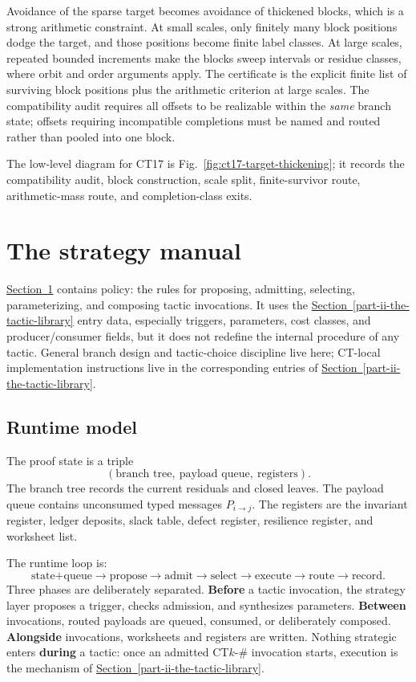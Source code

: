 \documentclass[
  11pt,
]{article}
\theoremstyle{definition}
\newcommand{\secref}[1]{\hyperref[#1]{Section~\ref*{#1}}}
\begin{document}
Avoidance of the sparse target becomes avoidance of thickened blocks,
which is a strong arithmetic constraint. At small scales, only finitely
many block positions dodge the target, and those positions become finite
label classes. At large scales, repeated bounded increments make the
blocks sweep intervals or residue classes, where orbit and order
arguments apply. The certificate is the explicit finite list of
surviving block positions plus the arithmetic criterion at large scales.
The compatibility audit requires all offsets to be realizable within the
\emph{same} branch state; offsets requiring incompatible completions must
be named and routed rather than pooled into one block.

The low-level diagram for CT17 is Fig.~\ref{fig:ct17-target-thickening};
it records the compatibility audit, block construction, scale split,
finite-survivor route, arithmetic-mass route, and completion-class exits.

\section{The strategy manual}\label{part-iii-the-strategy-manual}

\secref{part-iii-the-strategy-manual} contains policy: the rules for proposing, admitting,
selecting, parameterizing, and composing tactic invocations. It uses the
\secref{part-ii-the-tactic-library} entry data, especially triggers, parameters, cost classes, and
producer/consumer fields, but it does not redefine the internal
procedure of any tactic. General branch design and tactic-choice
discipline live here; CT-local implementation instructions live in the
corresponding entries of \secref{part-ii-the-tactic-library}.

\subsection{Runtime model}\label{runtime-model}

The proof state is a triple
\[
(\text{branch tree},\ \text{payload queue},\ \text{registers}).
\]
The branch tree records the current residuals and closed leaves. The
payload queue contains unconsumed typed messages \(P_{i\to j}\). The
registers are the invariant register, ledger deposits, slack table,
defect register, resilience register, and worksheet list.

The runtime loop is:
\[
\text{state+queue}\to\text{propose}\to\text{admit}\to\text{select}
\to\text{execute}\to\text{route}\to\text{record}.
\]
Three phases are deliberately separated. \textbf{Before} a tactic
invocation, the strategy layer proposes a trigger, checks admission, and
synthesizes parameters. \textbf{Between} invocations, routed payloads are
queued, consumed, or deliberately composed. \textbf{Alongside}
invocations, worksheets and registers are written. Nothing strategic
enters \textbf{during} a tactic: once an admitted CT\(k\)-\(\#\)
invocation starts, execution is the mechanism of \secref{part-ii-the-tactic-library}.
\end{document}
